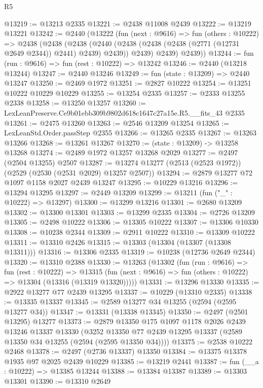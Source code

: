\begin{lexlean}{R5}
\begin{coremodule}
@13219 := @13213 @2335
@13221 := @2438 @11008 @2439
@13222 := @13219 @13221
@13242 := @2440
    (@13222
      (fun (next : @9616) =>
      fun (others : @10222) =>
      @2438
        (@2438
          (@2438
            (@2440 (@2438 (@2438 (@2438 (@2771 (@12731 @2649 @2344)) @2441) @2439) @2439))
            @2439)
          @2439)
        @2439))
@13244 := fun (run : @9616) => fun (rest : @10222) => @13242
@13246 := @2440 (@13218 @13244)
@13247 := @2440 @13246
@13249 := fun (state : @13209) => @2440 @13247
@13250 := @2469 @1972
@13251 := @2827 @10222
@13254 := @13251 @10222 @10229 @10229
@13255 := @13254 @2335
@13257 := @2333 @13255 @2338
@13258 := @13250 @13257
@13260 := LexLeanPreserve.Ce9b01ebb309b9802d618c1647c27a15e.R5.__fits_43 @2335
@13261 := @2475 @13260
@13263 := @2546 @13209 @13254
@13265 := LexLeanStd.Order.passStep @2355
@13266 := @13265 @2335
@13267 := @13263 @13266
@13268 := @13261 @13267
@13270 := (state : @13209) -> @13258 @13268
@13274 := @2489 @1972 @13257 @13268 @2029
@13277 := @2497 (@2504 @13255) @2507
@13287 := @13274 @13277 (@2513 (@2523 @1972)) (@2529 (@2530 (@2531 @2029) @13257 @2507))
@13294 := @2879 @13277 @72 @1097 @1158 @2027 @2439 @13247
@13295 := @10229 @13216
@13296 := @13294 @13295
@13297 := @2449 @13209
@13299 := @13211 (fun ("_" : @10222) => @13297)
@13300 := @13299 @13216
@13301 := @2680 @13209
@13302 := @13300 @13301
@13303 := @13299 @2335
@13304 := @2726 @13209
@13305 := @2498 @10222
@13306 := @13305 @10222
@13307 := @13306 @10330
@13308 := @10238 @2344
@13309 := @2911 @10222
@13310 := @13309 @10222
@13311 := @13310 @2426
@13315 := @13303 (@13304 (@13307 (@13308 @13311)))
@13316 := @13306 @2335
@13319 := @10238 (@12736 @2649 @2344)
@13320 := @13310 @2388
@13330 := @13263
    (@13302
      (fun (run : @9616) =>
      fun (rest : @10222) =>
      @13315 (fun (next : @9616) => fun (others : @10222) => @13304 (@13316 (@13319 @13320)))))
@13331 := @13296 @13330
@13335 := @2922 @13277 @77 @2439 @13295
@13337 := @10229 (@13310 @2335)
@13338 := @13335 @13337
@13345 := @2589 @13277 @34 @13255 (@2594 (@2595 @13277 @34))
@13347 := @13331 (@13338 @13345)
@13350 := @2497 (@2501 @13295) @13277
@13373 := @2879
    @13350
    @175
    @1097
    @1178
    @2026
    @2439
    @13246
    @13337
    @13330
    (@3252 @13350 @77 @2439 @13295 @13337 (@2589 @13350 @34 @13255 (@2594 (@2595 @13350 @34))))
@13375 := @2538 @10222 @2468
@13378 := @2497 (@2736 @13337) @13350
@13384 := @13375 @13378 @1935 @97 @2025 @2439 @10229
@13385 := @13219 @2441
@13387 := fun (__a : @10222) => @13385 @13244
@13388 := @13384 @13387
@13389 := @13303 @13301
@13390 := @13310 @2649

\end{coremodule}
\end{lexlean}
